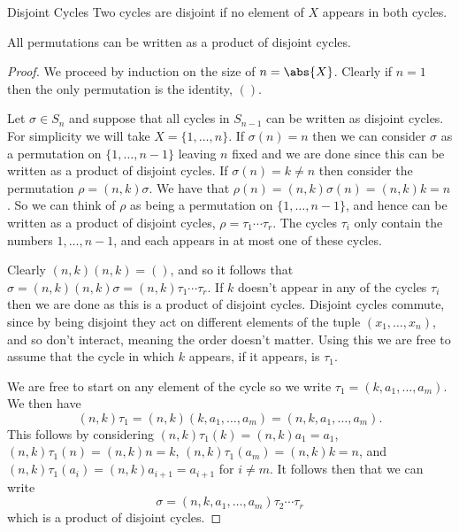 \documentclass[fleqn]{NotesClass}
\begin{document}
    \begin{dfn}{Disjoint Cycles}{}
        Two cycles are disjoint if no element of \(X\) appears in both cycles.
    \end{dfn}
    
    \begin{lma}{}{}
        All permutations can be written as a product of disjoint cycles.
        
        \begin{proof}
            We proceed by induction on the size of \(n = \abs{X}\).
            Clearly if \(n = 1\) then the only permutation is the identity, \(()\).
            
            Let \(\sigma \in S_n\) and suppose that all cycles in \(S_{n-1}\) can be written as disjoint cycles.
            For simplicity we will take \(X = \{1, \dotsc, n\}\).
            If \(\sigma(n) = n\) then we can consider \(\sigma\) as a permutation on \(\{1, \dotsc, n - 1\}\) leaving \(n\) fixed and we are done since this can be written as a product of disjoint cycles.
            If \(\sigma(n) = k \ne n\) then consider the permutation \(\rho = (n, k) \sigma\).
            We have that \(\rho(n) = (n, k)\sigma(n) = (n, k)k = n\).
            So we can think of \(\rho\) as being a permutation on \(\{1, \dotsc, n - 1\}\), and hence can be written as a product of disjoint cycles, \(\rho = \tau_1\dotsm \tau_r\).
            The cycles \(\tau_i\) only contain the numbers \(1, \dotsc, n -1\), and each appears in at most one of these cycles.
            
            Clearly \((n, k)(n, k) = ()\), and so it follows that
            \(\sigma = (n, k)(n, k)\sigma = (n, k)\tau_1\dotsm \tau_r\).
            If \(k\) doesn't appear in any of the cycles \(\tau_i\) then we are done as this is a product of disjoint cycles.
            Disjoint cycles commute, since by being disjoint they act on different elements of the tuple \((x_1, \dotsc, x_n)\), and so don't interact, meaning the order doesn't matter.
            Using this we are free to assume that the cycle in which \(k\) appears, if it appears, is \(\tau_1\).
            
            We are free to start on any element of the cycle so we write \(\tau_1 = (k, a_1, \dotsc, a_m)\).
            We then have
            \begin{equation}
                (n, k)\tau_1 = (n, k)(k, a_1, \dotsc, a_m) = (n, k, a_1, \dotsc, a_m).
            \end{equation}
            This follows by considering \((n, k)\tau_1(k) = (n, k)a_1 = a_1\), \((n, k)\tau_1(n) = (n, k)n = k\), \((n, k)\tau_1(a_m) = (n, k)k = n\), and \((n, k)\tau_1(a_i) = (n, k)a_{i+1} = a_{i+1}\) for \(i \ne m\).
            It follows then that we can write
            \begin{equation}
                \sigma = (n, k, a_1, \dotsc, a_m)\tau_2\dotsm \tau_r
            \end{equation}
            which is a product of disjoint cycles.
            

\end{proof}
\end{lma}
\end{document}
